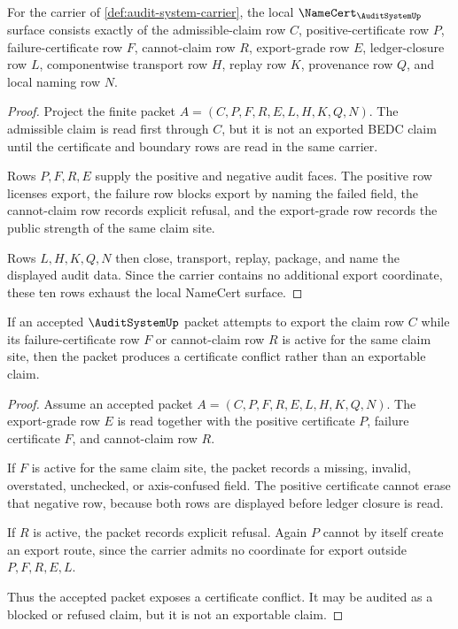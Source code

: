 \begin{theorem}
\label{thm:audit-system-namecert-surface}
For the carrier of \autoref{def:audit-system-carrier}, the local $\NameCert_{\AuditSystemUp}$ surface consists exactly of the admissible-claim row $C$, positive-certificate row $P$, failure-certificate row $F$, cannot-claim row $R$, export-grade row $E$, ledger-closure row $L$, componentwise transport row $H$, replay row $K$, provenance row $Q$, and local naming row $N$.
\end{theorem}
\begin{proof}
Project the finite packet $A=(C,P,F,R,E,L,H,K,Q,N)$. The admissible claim is read first through $C$, but it is not an exported BEDC claim until the certificate and boundary rows are read in the same carrier.

Rows $P,F,R,E$ supply the positive and negative audit faces. The positive row licenses export, the failure row blocks export by naming the failed field, the cannot-claim row records explicit refusal, and the export-grade row records the public strength of the same claim site.

Rows $L,H,K,Q,N$ then close, transport, replay, package, and name the displayed audit data. Since the carrier contains no additional export coordinate, these ten rows exhaust the local NameCert surface.
\end{proof}

\begin{theorem}
\label{thm:audit-system-export-refusal}
If an accepted $\AuditSystemUp$ packet attempts to export the claim row $C$ while its failure-certificate row $F$ or cannot-claim row $R$ is active for the same claim site, then the packet produces a certificate conflict rather than an exportable claim.
\end{theorem}
\begin{proof}
Assume an accepted packet $A=(C,P,F,R,E,L,H,K,Q,N)$. The export-grade row $E$ is read together with the positive certificate $P$, failure certificate $F$, and cannot-claim row $R$.

If $F$ is active for the same claim site, the packet records a missing, invalid, overstated, unchecked, or axis-confused field. The positive certificate cannot erase that negative row, because both rows are displayed before ledger closure is read.

If $R$ is active, the packet records explicit refusal. Again $P$ cannot by itself create an export route, since the carrier admits no coordinate for export outside $P,F,R,E,L$.

Thus the accepted packet exposes a certificate conflict. It may be audited as a blocked or refused claim, but it is not an exportable claim.
\end{proof}

